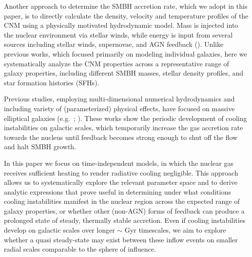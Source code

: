 \documentclass[usenatbib,fleqn]{mn2e}
\begin{document}

Another approach to determine the SMBH accretion rate, which we adopt
in this paper, is to directly calculate the density, velocity and
temperature profiles of the CNM using a physically motivated
hydrodynamic model.  Mass is injected into the nuclear environment via
stellar winds, while energy is input from several sources
including stellar winds, supernovae, and AGN feedback
(\citealt{Quataert:2004a,De-ColleGuillochon+:2012a,ShcherbakovWong+:2014a}).
Unlike previous works, which focused primarily on modeling individual
galaxies, here we systematically analyze the CNM properties across a representative
range of galaxy properties, including different SMBH masses, stellar
density profiles, and star formation histories (SFHs).

Previous studies, employing multi-dimensional numerical hydrodynamics and
including variety of (parameterized) physical effects, have focused on
massive elliptical galaxies (e.g.~\citealt{Ciotti&Ostriker07};
\citealt{Ciotti+10}).  These works show the periodic
development of cooling instabilities on galactic scales, which
temporarily increase the gas accretion rate towards the nucleus until
feedback becomes strong enough to shut off the flow and halt
SMBH growth.  

In this paper we focus on time-independent models, in which the
nuclear gas receives sufficient heating to render radiative cooling
negligible.  This approach allows us to systematically explore the
relevant parameter space and to derive analytic expressions that prove
useful in determining under what conditions cooling instabilities
manifest in the nuclear region across the expected range of galaxy properties, or whether
other (non-AGN) forms of feedback can produce a prolonged state of
steady, thermally stable accretion.  Even if cooling instabilities
develop on galactic scales over longer $\sim$ Gyr timescales, we aim to explore whether a quasi
steady-state may exist between these inflow events on smaller radial scales comparable to the sphere of influence.  
\end{document}
